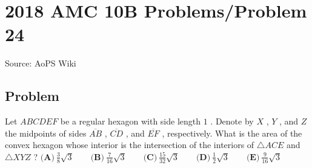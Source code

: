 \documentclass[12pt]{article}
\begin{document}
\section*{{2018 AMC 10B Problems/Problem 24}}
Source: AoPS Wiki

\subsection*{Problem}
Let $ABCDEF$ be a regular hexagon with side length $1$ . Denote by $X$ , $Y$ , and $Z$ the midpoints of sides $\overline {AB}$ , $\overline{CD}$ , and $\overline{EF}$ , respectively. What is the area of the convex hexagon whose interior is the intersection of the interiors of $\triangle ACE$ and $\triangle XYZ$ ? $\textbf{(A)}\ \frac {3}{8}\sqrt{3} \qquad \textbf{(B)}\ \frac {7}{16}\sqrt{3} \qquad \textbf{(C)}\ \frac {15}{32}\sqrt{3} \qquad \textbf{(D)}\ \frac {1}{2}\sqrt{3} \qquad \textbf{(E)}\ \frac {9}{16}\sqrt{3}$
\end{document}
